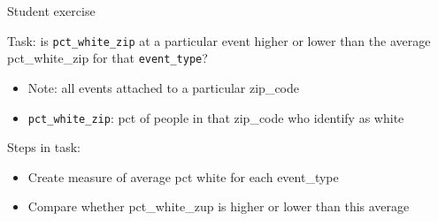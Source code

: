 \documentclass[8pt,ignorenonframetext,dvipsnames]{beamer}
\providecommand{\tightlist}{%
  \setlength{\itemsep}{0pt}\setlength{\parskip}{0pt}}
\begin{document}
\begin{frame}[fragile]{Student exercise}

Task: is \texttt{pct\_white\_zip} at a particular event higher or lower
than the average pct\_white\_zip for that \texttt{event\_type}?

\begin{itemize}
\tightlist
\item
  Note: all events attached to a particular zip\_code
\item
  \texttt{pct\_white\_zip}: pct of people in that zip\_code who identify
  as white
\end{itemize}

Steps in task:

\begin{itemize}
\tightlist
\item
  Create measure of average pct white for each event\_type
\item
  Compare whether pct\_white\_zup is higher or lower than this average
\end{itemize}

\end{frame}
\end{document}
